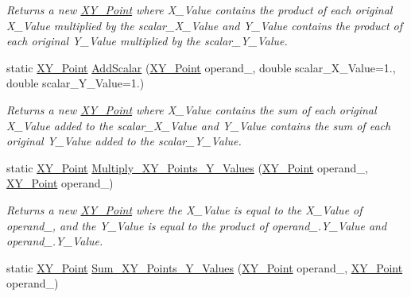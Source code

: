 \begin{DoxyCompactItemize}
\begin{DoxyCompactList}\small\item\em Returns a new \mbox{\hyperlink{struct_c_s_i_1_1_library_1_1_data_types_1_1_x_y___point}{X\+Y\+\_\+\+Point}} where X\+\_\+\+Value contains the product of each original X\+\_\+\+Value multiplied by the scalar\+\_\+\+X\+\_\+\+Value and Y\+\_\+\+Value contains the product of each original Y\+\_\+\+Value multiplied by the scalar\+\_\+\+Y\+\_\+\+Value. \end{DoxyCompactList}\item 
static \mbox{\hyperlink{struct_c_s_i_1_1_library_1_1_data_types_1_1_x_y___point}{X\+Y\+\_\+\+Point}} \mbox{\hyperlink{struct_c_s_i_1_1_library_1_1_data_types_1_1_x_y___point_a2609124ccfc07722332384911c13bad9}{Add\+Scalar}} (\mbox{\hyperlink{struct_c_s_i_1_1_library_1_1_data_types_1_1_x_y___point}{X\+Y\+\_\+\+Point}} operand\+\_, double scalar\+\_\+\+X\+\_\+\+Value=1., double scalar\+\_\+\+Y\+\_\+\+Value=1.)
\begin{DoxyCompactList}\small\item\em Returns a new \mbox{\hyperlink{struct_c_s_i_1_1_library_1_1_data_types_1_1_x_y___point}{X\+Y\+\_\+\+Point}} where X\+\_\+\+Value contains the sum of each original X\+\_\+\+Value added to the scalar\+\_\+\+X\+\_\+\+Value and Y\+\_\+\+Value contains the sum of each original Y\+\_\+\+Value added to the scalar\+\_\+\+Y\+\_\+\+Value. \end{DoxyCompactList}\item 
static \mbox{\hyperlink{struct_c_s_i_1_1_library_1_1_data_types_1_1_x_y___point}{X\+Y\+\_\+\+Point}} \mbox{\hyperlink{struct_c_s_i_1_1_library_1_1_data_types_1_1_x_y___point_ab302194d8398608888249acc07a0b749}{Multiply\+\_\+\+X\+Y\+\_\+\+Points\+\_\+\+Y\+\_\+\+Values}} (\mbox{\hyperlink{struct_c_s_i_1_1_library_1_1_data_types_1_1_x_y___point}{X\+Y\+\_\+\+Point}} operand\+\_, \mbox{\hyperlink{struct_c_s_i_1_1_library_1_1_data_types_1_1_x_y___point}{X\+Y\+\_\+\+Point}} operand\+\_)
\begin{DoxyCompactList}\small\item\em Returns a new \mbox{\hyperlink{struct_c_s_i_1_1_library_1_1_data_types_1_1_x_y___point}{X\+Y\+\_\+\+Point}} where the X\+\_\+\+Value is equal to the X\+\_\+\+Value of operand\+\_, and the Y\+\_\+\+Value is equal to the product of operand\+\_.\+Y\+\_\+\+Value and operand\+\_.\+Y\+\_\+\+Value. \end{DoxyCompactList}\item 
static \mbox{\hyperlink{struct_c_s_i_1_1_library_1_1_data_types_1_1_x_y___point}{X\+Y\+\_\+\+Point}} \mbox{\hyperlink{struct_c_s_i_1_1_library_1_1_data_types_1_1_x_y___point_a64aacee12f90dd3b9653de9d677cc6c0}{Sum\+\_\+\+X\+Y\+\_\+\+Points\+\_\+\+Y\+\_\+\+Values}} (\mbox{\hyperlink{struct_c_s_i_1_1_library_1_1_data_types_1_1_x_y___point}{X\+Y\+\_\+\+Point}} operand\+\_, \mbox{\hyperlink{struct_c_s_i_1_1_library_1_1_data_types_1_1_x_y___point}{X\+Y\+\_\+\+Point}} operand\+\_)

\end{DoxyCompactItemize}
